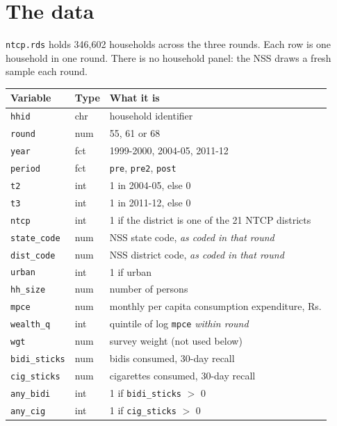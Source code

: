 \documentclass[11pt,a4paper]{article}
\begin{document}
\section*{The data}

\texttt{ntcp.rds} holds 346{,}602 households across the three rounds. Each row
is one household in one round. There is no household panel: the NSS draws a
fresh sample each round.

\begin{center}
\footnotesize
\begin{tabular}{@{}llp{8.1cm}@{}}
\toprule
\textbf{Variable} & \textbf{Type} & \textbf{What it is} \\
\midrule
\texttt{hhid}        & chr  & household identifier \\
\texttt{round}       & num  & 55, 61 or 68 \\
\texttt{year}        & fct  & 1999-2000, 2004-05, 2011-12 \\
\texttt{period}      & fct  & \texttt{pre}, \texttt{pre2}, \texttt{post} \\
\texttt{t2}          & int  & 1 in 2004-05, else 0 \\
\texttt{t3}          & int  & 1 in 2011-12, else 0 \\
\texttt{ntcp}        & int  & 1 if the district is one of the 21 NTCP districts \\
\texttt{state\_code} & num  & NSS state code, \emph{as coded in that round} \\
\texttt{dist\_code}  & num  & NSS district code, \emph{as coded in that round} \\
\texttt{urban}       & int  & 1 if urban \\
\texttt{hh\_size}    & num  & number of persons \\
\texttt{mpce}        & num  & monthly per capita consumption expenditure, Rs. \\
\texttt{wealth\_q}   & int  & quintile of log \texttt{mpce} \emph{within round} \\
\texttt{wgt}         & num  & survey weight (not used below) \\
\texttt{bidi\_sticks}& num  & bidis consumed, 30-day recall \\
\texttt{cig\_sticks} & num  & cigarettes consumed, 30-day recall \\
\texttt{any\_bidi}   & int  & 1 if \texttt{bidi\_sticks} $>$ 0 \\
\texttt{any\_cig}    & int  & 1 if \texttt{cig\_sticks} $>$ 0 \\
\bottomrule
\end{tabular}
\end{center}
\end{document}
